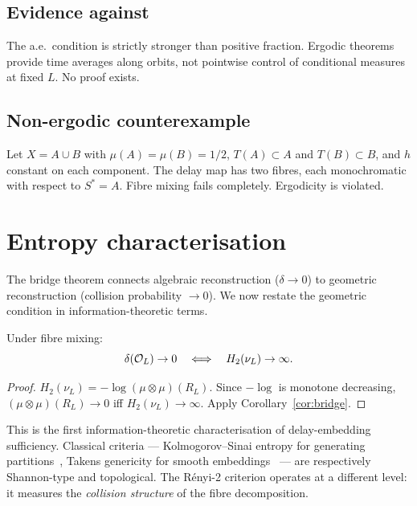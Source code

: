 \subsection*{Evidence against}

The a.e.\ condition is strictly stronger than positive fraction.
Ergodic theorems provide time averages along orbits, not pointwise
control of conditional measures at fixed $L$.  No proof exists.

\subsection*{Non-ergodic counterexample}

Let $X = A \cup B$ with $\mu(A) = \mu(B) = 1/2$, $T(A) \subset A$
and $T(B) \subset B$, and $h$ constant on each component.  The delay
map has two fibres, each monochromatic with respect to $S^* = A$.
Fibre mixing fails completely.  Ergodicity is violated.


\section{Entropy characterisation}
\label{sec:entropy}

The bridge theorem connects algebraic reconstruction ($\delta \to 0$)
to geometric reconstruction (collision probability $\to 0$).  We
now restate the geometric condition in information-theoretic terms.

\begin{corollary}
\label{cor:entropy}
Under fibre mixing:
\begin{equation}\label{eq:entropy}
  \delta(\mathcal{O}_L) \to 0
  \quad\Longleftrightarrow\quad
  H_2(\nu_L) \to \infty.
\end{equation}
\end{corollary}

\begin{proof}
$H_2(\nu_L) = -\log(\mu \otimes \mu)(R_L)$.  Since
$-\log$ is monotone decreasing, $(\mu \otimes \mu)(R_L) \to 0$
iff $H_2(\nu_L) \to \infty$.  Apply Corollary~\ref{cor:bridge}.
\end{proof}

\noindent This is the first information-theoretic characterisation
of delay-embedding sufficiency.  Classical criteria ---
Kolmogorov--Sinai entropy for generating
partitions~\cite{Sinai1959}, Takens genericity for smooth
embeddings~\cite{Takens1981} --- are respectively Shannon-type
and topological.  The R\'{e}nyi-2 criterion operates at a
different level: it measures the \emph{collision structure} of the
fibre decomposition.

